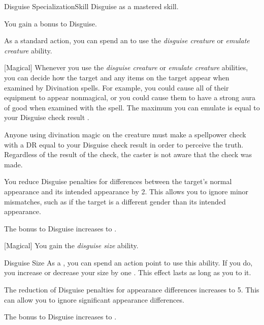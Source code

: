     \begin{feat}{Disguise Specialization}{Skill}
        \featpre Disguise as a mastered skill.

         You gain a  bonus to Disguise.

         As a standard action, you can spend an  to use the \textit{disguise creature} or \textit{emulate creature} ability.

        [Magical] Whenever you use the \textit{disguise creature} or \textit{emulate creature} abilities, you can decide how the target and any items on the target appear when examined by Divination spells.
        For example, you could cause all of their equipment to appear nonmagical, or you could cause them to have a strong aura of good when examined with the  spell.
        The maximum  you can emulate is equal to your Disguise check result .

        Anyone using divination magic on the creature must make a spellpower check with a DR equal to your Disguise check result in order to perceive the truth.
        Regardless of the result of the check, the caster is not aware that the check was made.

         You reduce Disguise penalties for differences between the target's normal appearance and its intended appearance by 2.
        This allows you to ignore minor mismatches, such as if the target is a different gender than its intended appearance.

         The bonus to Disguise increases to .

        [Magical] You gain the \textit{disguise size} ability.
        \begin{ability}{Disguise Size}
            As a , you can spend an action point to use this ability.
            If you do, you increase or decrease your size by one .
            This effect lasts as long as you  to it.
        \end{ability}

         The reduction of Disguise penalties for appearance differences increases to 5.
        This can allow you to ignore significant appearance differences.

         The bonus to Disguise increases to .
    \end{feat}

